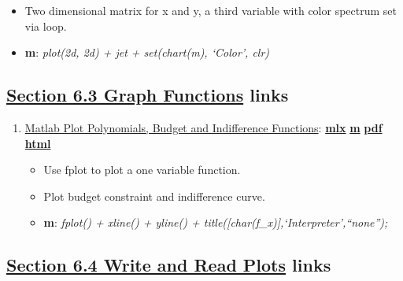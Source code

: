 \documentclass[
]{book}
\providecommand{\tightlist}{%
  \setlength{\itemsep}{0pt}\setlength{\parskip}{0pt}}
\begin{document}
\begin{enumerate}
  \begin{itemize}
  \tightlist
  \item
    Two dimensional matrix for x and y, a third variable with color spectrum set via loop.
  \item
    \textbf{m}: \emph{plot(2d, 2d) + jet + set(chart(m), `Color', clr)}
  \end{itemize}
\end{enumerate}

\hypertarget{section-6.3-graph-functionsgraph-functions-links}{%
\subsection{\texorpdfstring{\protect\hyperlink{graph-functions}{Section 6.3 Graph Functions} links}{Section 6.3 Graph Functions links}}\label{section-6.3-graph-functionsgraph-functions-links}}

\begin{enumerate}
\def\labelenumi{\arabic{enumi}.}
\tightlist
\item
  \href{https://fanwangecon.github.io/M4Econ/graph/func/htmlpdfm/fs_fplot.html}{Matlab Plot Polynomials, Budget and Indifference Functions}: \href{https://github.com/FanWangEcon/M4Econ/blob/master/graph/func/fs_fplot.mlx}{\textbf{mlx}} \textbar{} \href{https://github.com/FanWangEcon/M4Econ/blob/master/graph/func/htmlpdfm/fs_fplot.m}{\textbf{m}} \textbar{} \href{https://github.com/FanWangEcon/M4Econ/blob/master/graph/func/htmlpdfm/fs_fplot.pdf}{\textbf{pdf}} \textbar{} \href{https://fanwangecon.github.io/M4Econ/graph/func/htmlpdfm/fs_fplot.html}{\textbf{html}}

  \begin{itemize}
  \tightlist
  \item
    Use fplot to plot a one variable function.
  \item
    Plot budget constraint and indifference curve.
  \item
    \textbf{m}: \emph{fplot() + xline() + yline() + title({[}char(f\_x){]},`Interpreter',``none'');}
  \end{itemize}
\end{enumerate}

\hypertarget{section-6.4-write-and-read-plotswrite-and-read-plots-links}{%
\subsection{\texorpdfstring{\protect\hyperlink{write-and-read-plots}{Section 6.4 Write and Read Plots} links}{Section 6.4 Write and Read Plots links}}\label{section-6.4-write-and-read-plotswrite-and-read-plots-links}}
\end{document}
